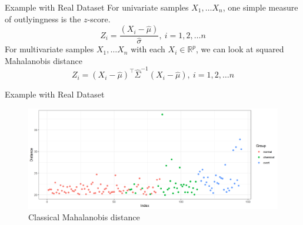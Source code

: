 \documentclass[10pt,xcolor=svgnames]{beamer} %
\newcommand{\R}{\mathbb{R}}
\newcommand{\tr}{^{\intercal}}
\begin{document}
\begin{frame}{Example with Real Dataset}
    For univariate samples $X_1, \dots X_n$, one simple measure of outlyingness is the $z$-score.
    \begin{equation*}
        Z_i = \dfrac{(X_i - \widehat{\mu})}{\widehat{\sigma}}, \ i = 1, 2, \dots n
    \end{equation*}
    \pause 
    For multivariate samples $X_1, \dots X_n$ with each $X_i \in \R^p$, we can look at squared Mahalanobis distance
    \begin{equation*}
        Z_i = (X_i - \widehat{\mu})\tr \widehat{\Sigma}^{-1} (X_i - \widehat{\mu}), \ i = 1, 2, \dots n
    \end{equation*}
\end{frame}


\begin{frame}{Example with Real Dataset}
    \begin{figure}
        \centering
        \includegraphics[width = \textwidth]{images/Distance-classic.png}
        \caption{Classical Mahalanobis distance}
    \end{figure}
\end{frame}
\end{document}
